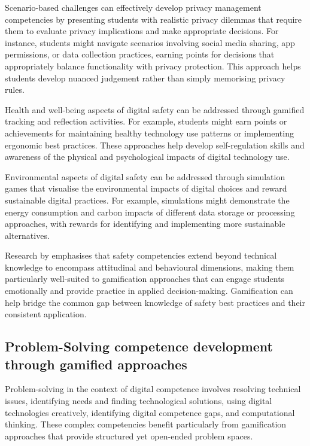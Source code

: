 \documentclass[cte]{acnsart}
\begin{document}
Scenario-based challenges can effectively develop privacy management competencies by presenting students with realistic privacy dilemmas that require them to evaluate privacy implications and make appropriate decisions. For instance, students might navigate scenarios involving social media sharing, app permissions, or data collection practices, earning points for decisions that appropriately balance functionality with privacy protection. This approach helps students develop nuanced judgement rather than simply memorising privacy rules.

Health and well-being aspects of digital safety can be addressed through gamified tracking and reflection activities. For example, students might earn points or achievements for maintaining healthy technology use patterns or implementing ergonomic best practices. These approaches help develop self-regulation skills and awareness of the physical and psychological impacts of digital technology use.

Environmental aspects of digital safety can be addressed through simulation games that visualise the environmental impacts of digital choices and reward sustainable digital practices. For example, simulations might demonstrate the energy consumption and carbon impacts of different data storage or processing approaches, with rewards for identifying and implementing more sustainable alternatives.

Research by \citet{Vuorikari2016} emphasises that safety competencies extend beyond technical knowledge to encompass attitudinal and behavioural dimensions, making them particularly well-suited to gamification approaches that can engage students emotionally and provide practice in applied decision-making. Gamification can help bridge the common gap between knowledge of safety best practices and their consistent application.

\subsection{Problem-Solving competence development through gamified approaches}

Problem-solving in the context of digital competence involves resolving technical issues, identifying needs and finding technological solutions, using digital technologies creatively, identifying digital competence gaps, and computational thinking. These complex competencies benefit particularly from gamification approaches that provide structured yet open-ended problem spaces.
\end{document}
